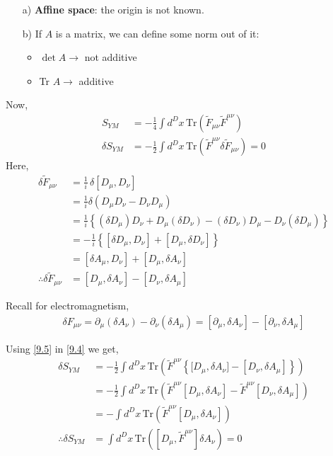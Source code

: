 \documentclass[14pt]{article} %
\begin{document}
\begin{tcolorbox}[ title=Extra information]
\begin{itemize}
\item [a)] \textbf{Affine space}: the origin is not known.
\item [b)] If $A$ is a matrix, we can define some norm out of it:
    \begin{itemize}
        \item $\det A \to$ not additive
        \item Tr $A \to$ additive
    \end{itemize}
\end{itemize}
\end{tcolorbox}
Now,
\begin{align*}
S_{YM} &= -\frac{1}{4} \int d^D x \, \mathrm{Tr}\left( \tilde{F}_{\mu \nu} \tilde{F}^{\mu \nu} \right) \\
\delta S_{YM} &= -\frac{1}{2} \int d^D x \, \mathrm{Tr}\left( \tilde{F}^{\mu \nu} \delta \tilde{F}_{\mu \nu} \right) =0 \tag{9.4} \label{9.4}
\end{align*}
Here,
\begin{align*}
\delta \tilde{F}_{\mu \nu} &= \frac{1}{i}\, \delta [D_\mu, D_\nu] \\
&= \frac{1}{i} \delta (D_\mu D_\nu - D_\nu D_\mu) \\
&= \frac{1}{i} \left\{ (\delta D_\mu) D_\nu + D_\mu (\delta D_\nu) - (\delta D_\nu) D_\mu - D_\nu (\delta D_\mu) \right\} \\
&= -\frac{1}{i} \left\{ [\delta D_\mu, D_\nu] + [D_\mu, \delta D_\nu] \right\} \\
&=[\delta A_\mu, D_\nu] + [D_\mu, \delta A_\nu] \\
\therefore \delta \tilde{F}_{\mu \nu} &= [D_\mu, \delta A_\nu] - [D_\nu, \delta A_\mu] \tag{9.5} \label{9.5}
\end{align*}
\begin{tcolorbox}
Recall for electromagnetism,
\begin{align*}
\delta F_{\mu \nu} = \partial_\mu (\delta A_\nu )-\partial_\nu (\delta A_\mu) = [\partial_\mu , \delta A_\nu ] - [\partial_\nu , \delta A_\mu]
\end{align*}
\end{tcolorbox}
Using \eqref{9.5} in \eqref{9.4} we get,
\begin{align*}
\delta S_{YM} &= -\frac{1}{2} \int d^D x \, \mathrm{Tr}\left( \tilde{F}^{\mu \nu}\left\{ \big[ D_\mu, \delta A_\nu \big] - \left[ D_\nu, \delta A_\mu \right] \right\}\right) \\
&= -\frac{1}{2} \int d^D x \, \mathrm{Tr}\left( \tilde{F}^{\mu \nu}\left[ D_\mu, \delta A_\nu \right] - \tilde{F}^{\mu \nu}\left[ D_\nu, \delta A_\mu \right] \right) \\
&=- \int d^D x \, \mathrm{Tr}\left( \tilde{F}^{\mu \nu}\left[ D_\mu, \delta A_\nu \right]\right) \\
\therefore \delta S_{YM}&= \int d^D x \, \mathrm{Tr}\left( \left[ D_\mu, \tilde{F}^{\mu \nu}\right] \delta A_\nu \right) = 0
\end{align*}
\end{document}
